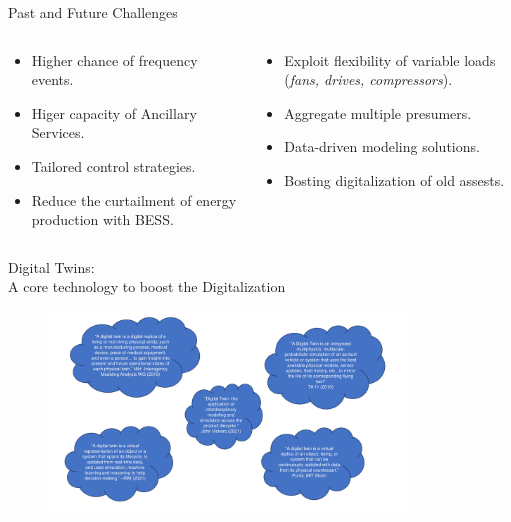 \documentclass[aspectratio=169,hyperref={pdfpagelabels=false}]{beamer}
\begin{document}
\begin{frame}{Past and Future Challenges}
  \begin{columns}
    \begin{column}{0.5\textwidth}
      \begin{itemize}
        \item Higher chance of frequency events. 
        \item Higer capacity of Ancillary Services. 
        \item Tailored control strategies. 
        \item Reduce the curtailment of energy production with BESS. \pause
      \end{itemize}
    \end{column}

    \begin{column}{0.5\textwidth}
      \begin{itemize}
        \item Exploit flexibility of variable loads (\textit{fans, drives, compressors}). 
        \item Aggregate multiple presumers.
        \item Data-driven modeling solutions. 
        \item Bosting digitalization of old assests. 
      \end{itemize}
    \end{column}
  \end{columns}
\end{frame}

\begin{frame}{Digital Twins: \\ \vspace{0.5em}
               \normalsize{A core technology to boost the Digitalization}}

  \begin{figure}[h]
    \vspace{3em}
    \includegraphics[width=0.85\textwidth]{img/digital_twin_definitions.pdf} \centering
  \end{figure}
\end{frame}
\end{document}
